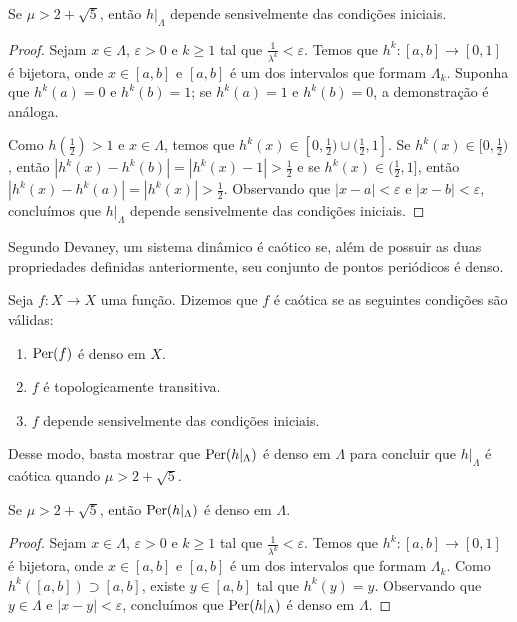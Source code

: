 \begin{proposition}
Se $\mu > 2 + \sqrt{5}$, então $h|_\Lambda$ depende sensivelmente das condições iniciais.
\end{proposition}

\begin{proof}
Sejam $x \in \Lambda$, $\varepsilon > 0$ e $k \geq 1$ tal que $\frac{1}{\lambda^k} < \varepsilon$.
Temos que $h^k: [a, b] \to [0, 1]$ é bijetora, onde $x \in [a, b]$ e $[a, b]$ é um dos intervalos que formam $\Lambda_k$. Suponha que $h^k(a) = 0$ e $h^k(b) = 1$; se $h^k(a) = 1$ e $h^k(b) = 0$, a demonstração é análoga.

Como $h(\frac{1}{2}) > 1$ e $x \in \Lambda$, temos que $h^{k}(x) \in [0, \frac{1}{2}) \cup (\frac{1}{2}, 1]$. Se $h^{k}(x) \in [0, \frac{1}{2})$, então $|h^k(x) - h^k(b)| = |h^k(x) - 1| > \frac{1}{2}$ e se $h^{k}(x) \in (\frac{1}{2}, 1]$, então $|h^k(x) - h^k(a)| = |h^k(x)| > \frac{1}{2}$. Observando que $|x - a| < \varepsilon$ e  $|x - b| < \varepsilon$, concluímos que $h|_\Lambda$ depende sensivelmente das condições iniciais.
\end{proof}

Segundo Devaney, um sistema dinâmico é caótico se, além de possuir as duas propriedades definidas anteriormente, seu conjunto de pontos periódicos é denso. 

\begin{definition}
Seja $f: X \to X$ uma função. Dizemos que $f$ é caótica se as seguintes condições são válidas:
\begin{enumerate}[label=\roman*.]
\item $\operatorname{Per}(f)$ é denso em $X$.
\item $f$ é topologicamente transitiva.
\item $f$ depende sensivelmente das condições iniciais.
\end{enumerate}
\end{definition}

Desse modo, basta mostrar que $\operatorname{Per}(h|_\Lambda)$ é denso em $\Lambda$ para concluir que $h|_\Lambda$ é caótica quando $\mu > 2 + \sqrt{5}$.

\begin{proposition}
Se $\mu > 2 + \sqrt{5}$, então $\operatorname{Per}(h|_\Lambda)$ é denso em $\Lambda$.
\end{proposition}

\begin{proof}
Sejam $x \in \Lambda$, $\varepsilon > 0$ e $k \geq 1$ tal que $\frac{1}{\lambda^k} < \varepsilon$.
Temos que $h^k: [a, b] \to [0, 1]$ é bijetora, onde $x \in [a, b]$ e $[a, b]$ é um dos intervalos que formam $\Lambda_k$.
Como $h^k([a, b]) \supset [a, b]$, existe $y \in [a, b]$ tal que $h^k(y) = y$. Observando que $y \in \Lambda$ e $|x - y| < \varepsilon$, concluímos que $\operatorname{Per}(h|_\Lambda)$ é denso em $\Lambda$.
\end{proof}

